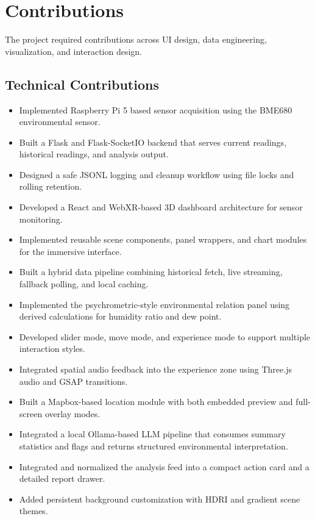 \documentclass[conference]{IEEEtran}
\begin{document}
\section{Contributions}
The project required contributions across UI design, data engineering, visualization, and interaction design.

\subsection{Technical Contributions}
\begin{itemize}
\item Implemented Raspberry Pi 5 based sensor acquisition using the BME680 environmental sensor.
\item Built a Flask and Flask-SocketIO backend that serves current readings, historical readings, and analysis output.
\item Designed a safe JSONL logging and cleanup workflow using file locks and rolling retention.
\item Developed a React and WebXR-based 3D dashboard architecture for sensor monitoring.
\item Implemented reusable scene components, panel wrappers, and chart modules for the immersive interface.
\item Built a hybrid data pipeline combining historical fetch, live streaming, fallback polling, and local caching.
\item Implemented the psychrometric-style environmental relation panel using derived calculations for humidity ratio and dew point.
\item Developed slider mode, move mode, and experience mode to support multiple interaction styles.
\item Integrated spatial audio feedback into the experience zone using Three.js audio and GSAP transitions.
\item Built a Mapbox-based location module with both embedded preview and full-screen overlay modes.
\item Integrated a local Ollama-based LLM pipeline that consumes summary statistics and flags and returns structured environmental interpretation.
\item Integrated and normalized the analysis feed into a compact action card and a detailed report drawer.
\item Added persistent background customization with HDRI and gradient scene themes.
\end{itemize}
\end{document}
